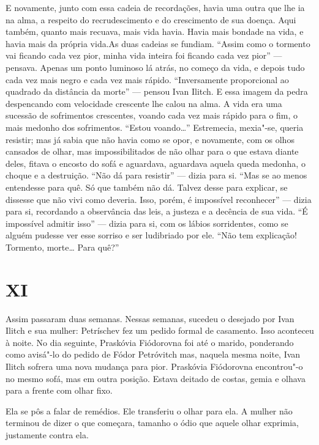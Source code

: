 E novamente, junto com essa cadeia de recordações, havia uma outra que
lhe ia na alma, a respeito do recrudescimento e do crescimento de sua
doença. Aqui também, quanto mais recuava, mais vida havia. Havia mais
bondade na vida, e havia mais da própria vida.As duas cadeias se
fundiam. ``Assim como o tormento vai ficando cada vez pior, minha vida
inteira foi ficando cada vez pior'' --- pensava. Apenas um ponto luminoso
lá atrás, no começo da vida, e depois tudo cada vez mais negro e cada
vez mais rápido. ``Inversamente proporcional ao quadrado da distância da
morte'' --- pensou Ivan Ilitch. E essa imagem da pedra despencando com
velocidade crescente lhe calou na alma. A vida era uma sucessão de
sofrimentos crescentes, voando cada vez mais rápido para o fim, o mais
medonho dos sofrimentos. ``Estou voando\ldots{}'' Estremecia, mexia"-se,
queria resistir; mas já sabia que não havia como se opor, e novamente,
com os olhos cansados de olhar, mas impossibilitados de não olhar para o
que estava diante deles, fitava o encosto do sofá e aguardava, aguardava
aquela queda medonha, o choque e a destruição. ``Não dá para resistir''
--- dizia para si. ``Mas se ao menos entendesse para quê. Só que também
não dá. Talvez desse para explicar, se dissesse que não vivi como
deveria. Isso, porém, é impossível reconhecer'' --- dizia para si,
recordando a observância das leis, a justeza e a decência de sua vida.
``É impossível admitir isso'' --- dizia para si, com os lábios
sorridentes, como se alguém pudesse ver esse sorriso e ser ludibriado
por ele. ``Não tem explicação! Tormento, morte\ldots{} Para quê?''

\section*{XI}

Assim passaram duas semanas. Nessas semanas, sucedeu o desejado por Ivan
Ilitch e sua mulher: Petríschev fez um pedido formal de casamento. Isso
aconteceu à noite. No dia seguinte, Praskóvia Fiódorovna foi até o
marido, ponderando como avisá"-lo do pedido de Fódor Petróvitch mas,
naquela mesma noite, Ivan Ilitch sofrera uma nova mudança para pior.
Praskóvia Fiódorovna encontrou"-o no mesmo sofá, mas em outra posição.
Estava deitado de costas, gemia e olhava para a frente com olhar fixo.

Ela se pôs a falar de remédios. Ele transferiu o olhar para ela. A
mulher não terminou de dizer o que começara, tamanho o ódio que aquele
olhar exprimia, justamente contra ela.

